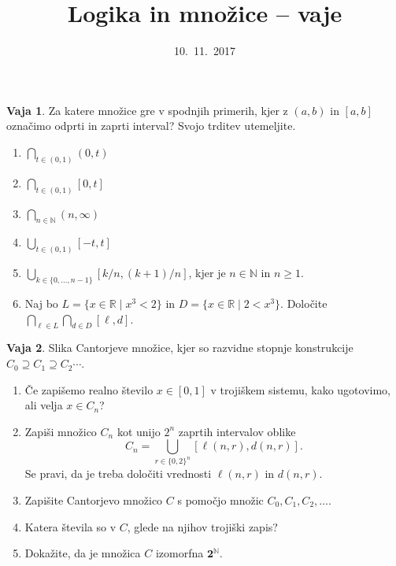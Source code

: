 \documentclass{article}
\newcommand{\two}{\mathbf{2}}
\newcommand{\NN}{\mathbb{N}}
\newcommand{\RR}{\mathbb{R}}
\theoremstyle{definition}
\newtheorem{vaja}{Vaja}
\begin{document}
\title{Logika in množice -- vaje}
\date{10.~11.~2017}
\maketitle

\begin{vaja}
  Za katere množice gre v spodnjih primerih, kjer z $(a, b)$ in $[a, b]$ označimo odprti
  in zaprti interval? Svojo trditev utemeljite.
  \begin{enumerate}
    \item
      $\bigcap_{t \in (0, 1)} (0, t)$
    \item
      $\bigcap_{t \in (0, 1)} [0, t]$
    \item
      $\bigcap_{n \in \NN} (n, \infty)$
    \item
      $\bigcup_{t \in (0, 1)} [-t, t]$
    \item
      $\bigcup_{k \in \{0, \ldots, n-1\}} [k/n, (k+1)/n]$, kjer je $n \in \NN$ in $n \geq 1$.
    \item
      Naj bo $L = \{x \in \RR \mid x^3 < 2\}$ in $D = \{x \in \RR \mid 2 < x^3\}$.
      Določite $\bigcap_{\ell \in L} \bigcap_{d \in D} [\ell, d]$.
  \end{enumerate}
\end{vaja}

\begin{vaja}
  Slika Cantorjeve množice, kjer so razvidne stopnje konstrukcije
  $C_0 \supseteq C_1 \supseteq C_2 \cdots$.
  \begin{enumerate}
  \item Če zapišemo realno število $x \in [0,1]$ v trojiškem sistemu, kako ugotovimo, ali
    velja $x \in C_n$?

  \item Zapiši množico $C_n$ kot unijo $2^n$ zaprtih intervalov oblike
    \begin{equation*}
      C_n = \bigcup_{r \in \{0,2\}^n} [\ell(n, r), d(n, r)].
    \end{equation*}
    Se pravi, da je treba določiti vrednosti $\ell(n, r)$ in $d(n, r)$.

  \item Zapišite Cantorjevo množico $C$ s pomočjo množic $C_0, C_1, C_2, \ldots$.

  \item Katera števila so v $C$, glede na njihov trojiški zapis?

  \item Dokažite, da je množica $C$ izomorfna $\two^\NN$.
  \end{enumerate}
\end{vaja}
\end{document}
